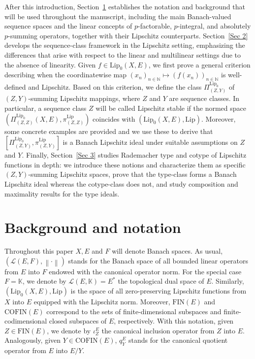 \documentclass[12pt]{amsart}
\def\L{\mathcal{L}}
\def\K{\mathbb{K}}
\def\N{\mathbb{N}}
\def\Lip{\mathrm{Lip}_0}
\def\Lipnorm{\mathrm{Lip}}
\begin{document}
After this introduction, Section~\ref{Sec 1} establishes the notation and background that will be used throughout the manuscript, including the main Banach-valued sequence spaces and the linear concepts of $p$-factorable, $p$-integral, and absolutely $p$-summing operators, together with their Lipschitz counterparts. Section~\ref{Sec 2} develops the sequence-class framework in the Lipschitz setting, emphasizing the differences that arise with respect to the linear and multilinear settings due to the absence of linearity. Given $f \in \Lip(X,E)$, we first prove a general criterion describing when the coordinatewise map $(x_n)_{n\in\N}\mapsto (f(x_n))_{n\in\N}$ is well-defined and Lipschitz. Based on this criterion, we define the class $\Pi_{(Z,Y)}^{\Lip}$ of $(Z,Y)$-summing Lipschitz mappings, where $Z$ and $Y$ are sequence classes. In particular, a sequence class $Z$ will be called Lipschitz stable if the normed space $(\Pi_{(Z,Z)}^{\Lip}(X,E),\pi_{(Z,Z)}^{\Lipnorm})$ coincides with $(\Lip(X,E),\Lipnorm)$. Moreover, some concrete examples are provided and we use these to derive that $[\Pi_{(Z,Y)}^{\Lip},\pi_{(Z,Y)}^{\Lipnorm}]$ is a Banach Lipschitz ideal under suitable assumptions on $Z$ and $Y$. Finally, Section~\ref{Sec 3} studies Rademacher type and cotype of Lipschitz functions in depth: we introduce these notions and characterize them as specific $(Z,Y)$-summing Lipschitz spaces, prove that the type-class forms a Banach Lipschitz ideal whereas the cotype-class does not, and study composition and maximality results for the type ideals.

\section{Background and notation}\label{Sec 1}

 Throughout this paper $X,E$ and $F$ will denote Banach spaces. As usual, $(\L(E,F),\left\|\cdot\right\|)$ stands for the Banach space of all bounded linear operators from $E$ into $F$ endowed with the canonical operator norm. For the special case $F=\K$, we denote by $\L(E,\K)=E^*$ the topological dual space of $E$. Similarly, $(\Lip(X,E),\Lipnorm)$ is the space of all zero-preserving Lipschitz functions from $X$ into $E$ equipped with the Lipschitz norm. Moreover, $\mathrm{FIN}(E)$ and $\mathrm{COFIN}(E)$ correspond to the sets of finite-dimensional subspaces and finite-codimensional closed subspaces of $E$, respectively. With this notation, given $Z \in \mathrm{FIN}(E)$, we denote by $\iota_Z^E$ the canonical inclusion operator from $Z$ into $E$. Analogously, given $Y \in \mathrm{COFIN}(E)$, $q_Y^E$ stands for the canonical quotient operator from $E$ into $E/Y$.
\end{document}
